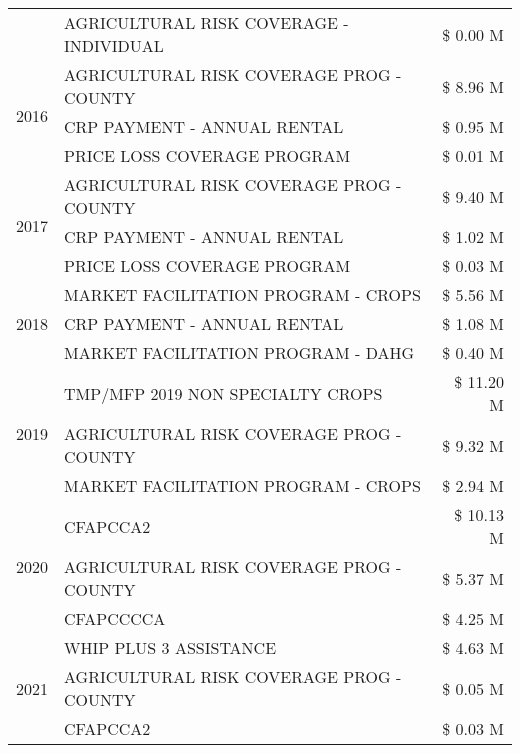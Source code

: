 \begin{tabular}{llr}
 & AGRICULTURAL RISK COVERAGE - INDIVIDUAL & \$ 0.00 M \\
\cline{1-3}
\multirow[t]{3}{*}{2016} & AGRICULTURAL RISK COVERAGE PROG - COUNTY & \$ 8.96 M \\
 & CRP PAYMENT - ANNUAL RENTAL & \$ 0.95 M \\
 & PRICE LOSS COVERAGE PROGRAM & \$ 0.01 M \\
\cline{1-3}
\multirow[t]{3}{*}{2017} & AGRICULTURAL RISK COVERAGE PROG - COUNTY & \$ 9.40 M \\
 & CRP PAYMENT - ANNUAL RENTAL & \$ 1.02 M \\
 & PRICE LOSS COVERAGE PROGRAM & \$ 0.03 M \\
\cline{1-3}
\multirow[t]{3}{*}{2018} & MARKET FACILITATION PROGRAM - CROPS & \$ 5.56 M \\
 & CRP PAYMENT - ANNUAL RENTAL & \$ 1.08 M \\
 & MARKET FACILITATION PROGRAM - DAHG & \$ 0.40 M \\
\cline{1-3}
\multirow[t]{3}{*}{2019} & TMP/MFP 2019 NON SPECIALTY CROPS & \$ 11.20 M \\
 & AGRICULTURAL RISK COVERAGE PROG - COUNTY & \$ 9.32 M \\
 & MARKET FACILITATION PROGRAM - CROPS & \$ 2.94 M \\
\cline{1-3}
\multirow[t]{3}{*}{2020} & CFAPCCA2 & \$ 10.13 M \\
 & AGRICULTURAL RISK COVERAGE PROG - COUNTY & \$ 5.37 M \\
 & CFAPCCCCA & \$ 4.25 M \\
\cline{1-3}
\multirow[t]{3}{*}{2021} & WHIP PLUS 3 ASSISTANCE & \$ 4.63 M \\
 & AGRICULTURAL RISK COVERAGE PROG - COUNTY & \$ 0.05 M \\
 & CFAPCCA2 & \$ 0.03 M \\
\cline{1-3}
\bottomrule
\end{tabular}
